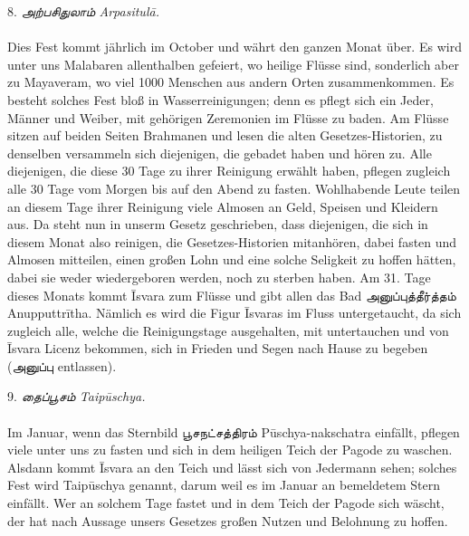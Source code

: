 \documentclass{article}
\newcommand{\TamilText}[1]{\texttamil{#1}}
\newcommand{\tam}[1]{\TamilText{#1}}
\begin{document}
\begin{center}
8. \emph{\tam{அற்பசிதுலாம்} Arpasitul\={a}.}
\end{center}
\paragraph{}
Dies Fest kommt jährlich im October und währt den ganzen Monat über. Es wird unter uns Malabaren allenthalben gefeiert, wo heilige Flüsse sind, sonderlich aber zu Mayaveram, wo viel 1000 Menschen aus andern Orten zusammenkommen. Es besteht solches Fest bloß in Wasserreinigungen; denn es pflegt sich ein Jeder, Männer und Weiber, mit gehörigen Zeremonien im Flüsse zu baden. Am Flüsse sitzen auf beiden Seiten Brahmanen und lesen die alten Gesetzes-Historien, zu denselben versammeln sich diejenigen, die gebadet haben und hören zu. Alle diejenigen, die diese 30 Tage zu ihrer Reinigung erwählt haben, pflegen zugleich alle 30 Tage vom Morgen bis auf den Abend zu fasten. Wohlhabende Leute teilen an diesem Tage ihrer Reinigung viele Almosen an Geld, Speisen und Kleidern aus. Da steht nun in unserm Gesetz geschrieben, dass diejenigen, die sich in diesem Monat also reinigen, die Gesetzes-Historien mitanhören, dabei fasten und Almosen mitteilen, einen großen Lohn und eine solche Seligkeit zu hoffen hätten, dabei sie weder wiedergeboren werden, noch zu sterben haben. Am 31. Tage dieses Monats kommt \={I}svara zum Flüsse und gibt allen das Bad \tam{அனுப்புத்தீர்த்தம்} Anupputtr\={i}tha. Nämlich es wird die Figur \={I}svaras im Fluss untergetaucht, da sich zugleich alle, welche die Reinigungstage ausgehalten, mit untertauchen und von \={I}svara Licenz bekommen, sich in Frieden und Segen nach Hause zu begeben (\tam{அனுப்பு} entlassen).

\begin{center}
9. \emph{\tam{தைப்பூசம்} Taip\={u}schya.}
\end{center}
\paragraph{}
Im Januar, wenn das Sternbild \tam{பூசநட்சத்திரம்} P\={u}schya-nakschatra einfällt, pflegen viele unter uns zu fasten und sich in dem heiligen Teich der Pagode zu waschen. Alsdann kommt \={I}svara an den Teich und lässt sich von Jedermann sehen; solches Fest wird Taip\={u}schya genannt, darum weil es im Januar an bemeldetem Stern einfällt. Wer an solchem Tage fastet und in dem Teich der Pagode sich wäscht, der hat nach Aussage unsers Gesetzes großen Nutzen und Belohnung zu hoffen.
\end{document}
